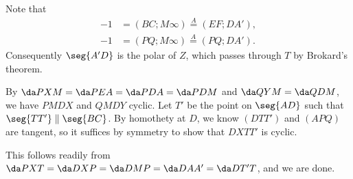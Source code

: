 Note that
\begin{align*}
    -1&=(BC;M\infty)\stackrel A=(EF;DA'),\\
    -1&=(PQ;M\infty)\stackrel A=(PQ;DA').
\end{align*}
Consequently $\seg{A'D}$ is the polar of $Z$, which passes through $T$ by Brokard's theorem.

By $\da PXM=\da PEA=\da PDA=\da PDM$ and $\da QYM=\da QDM$, we have $PMDX$ and $QMDY$ cyclic. Let $T'$ be the point on $\seg{AD}$ such that $\seg{TT'}\parallel\seg{BC}$. By homothety at $D$, we know $(DTT')$ and $(APQ)$ are tangent, so it suffices by symmetry to show that $DXTT'$ is cyclic.

This follows readily from $\da PXT=\da DXP=\da DMP=\da DAA'=\da DT'T$, and we are done.
